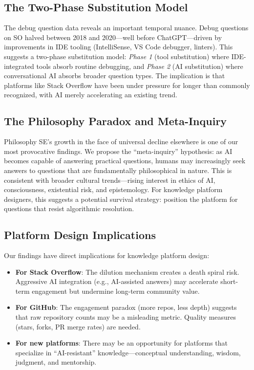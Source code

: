 \documentclass[11pt,a4paper]{article}
\begin{document}
\subsection{The Two-Phase Substitution Model}

The debug question data reveals an important temporal nuance. Debug questions on SO halved between 2018 and 2020---well before ChatGPT---driven by improvements in IDE tooling (IntelliSense, VS Code debugger, linters). This suggests a two-phase substitution model: \textit{Phase 1} (tool substitution) where IDE-integrated tools absorb routine debugging, and \textit{Phase 2} (AI substitution) where conversational AI absorbs broader question types. The implication is that platforms like Stack Overflow have been under pressure for longer than commonly recognized, with AI merely accelerating an existing trend.

\subsection{The Philosophy Paradox and Meta-Inquiry}

Philosophy SE's growth in the face of universal decline elsewhere is one of our most provocative findings. We propose the ``meta-inquiry'' hypothesis: as AI becomes capable of answering practical questions, humans may increasingly seek answers to questions that are fundamentally philosophical in nature. This is consistent with broader cultural trends---rising interest in ethics of AI, consciousness, existential risk, and epistemology. For knowledge platform designers, this suggests a potential survival strategy: position the platform for questions that resist algorithmic resolution.

\subsection{Platform Design Implications}

Our findings have direct implications for knowledge platform design:
\begin{itemize}
\item \textbf{For Stack Overflow}: The dilution mechanism creates a death spiral risk. Aggressive AI integration (e.g., AI-assisted answers) may accelerate short-term engagement but undermine long-term community value.
\item \textbf{For GitHub}: The engagement paradox (more repos, less depth) suggests that raw repository counts may be a misleading metric. Quality measures (stars, forks, PR merge rates) are needed.
\item \textbf{For new platforms}: There may be an opportunity for platforms that specialize in ``AI-resistant'' knowledge---conceptual understanding, wisdom, judgment, and mentorship.
\end{itemize}
\end{document}
